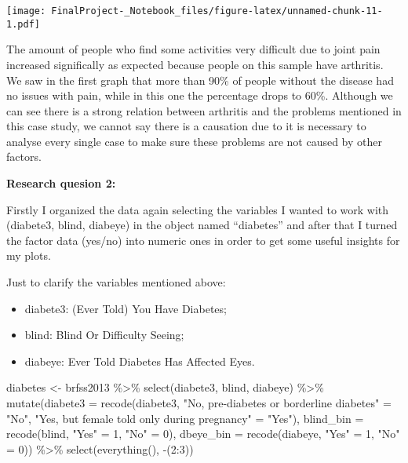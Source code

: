 \documentclass[
]{article}
\newenvironment{Shaded}{\begin{snugshade}}{\end{snugshade}}
\newcommand{\AttributeTok}[1]{\textcolor[rgb]{0.77,0.63,0.00}{#1}}
\newcommand{\DecValTok}[1]{\textcolor[rgb]{0.00,0.00,0.81}{#1}}
\newcommand{\FunctionTok}[1]{\textcolor[rgb]{0.00,0.00,0.00}{#1}}
\newcommand{\NormalTok}[1]{#1}
\newcommand{\OtherTok}[1]{\textcolor[rgb]{0.56,0.35,0.01}{#1}}
\newcommand{\SpecialCharTok}[1]{\textcolor[rgb]{0.00,0.00,0.00}{#1}}
\newcommand{\StringTok}[1]{\textcolor[rgb]{0.31,0.60,0.02}{#1}}
\providecommand{\tightlist}{%
  \setlength{\itemsep}{0pt}\setlength{\parskip}{0pt}}
\begin{document}
\texttt{[image: FinalProject-\_Notebook\_files/figure-latex/unnamed-chunk-11-1.pdf]}

The amount of people who find some activities very difficult due to
joint pain increased significally as expected because people on this
sample have arthritis. We saw in the first graph that more than 90\% of
people without the disease had no issues with pain, while in this one
the percentage drops to 60\%. Although we can see there is a strong
relation between arthritis and the problems mentioned in this case
study, we cannot say there is a causation due to it is necessary to
analyse every single case to make sure these problems are not caused by
other factors.

\textbf{Research quesion 2:}

Firstly I organized the data again selecting the variables I wanted to
work with (diabete3, blind, diabeye) in the object named ``diabetes''
and after that I turned the factor data (yes/no) into numeric ones in
order to get some useful insights for my plots.

Just to clarify the variables mentioned above:

\begin{itemize}
\tightlist
\item
  diabete3: (Ever Told) You Have Diabetes;
\item
  blind: Blind Or Difficulty Seeing;
\item
  diabeye: Ever Told Diabetes Has Affected Eyes.
\end{itemize}

\begin{Shaded}
\begin{Highlighting}[]
\NormalTok{diabetes }\OtherTok{\textless{}{-}}\NormalTok{ brfss2013 }\SpecialCharTok{\%\textgreater{}\%} 
  \FunctionTok{select}\NormalTok{(diabete3, blind, diabeye) }\SpecialCharTok{\%\textgreater{}\%} 
  \FunctionTok{mutate}\NormalTok{(}\AttributeTok{diabete3 =} \FunctionTok{recode}\NormalTok{(diabete3,}
                           \StringTok{"No, pre{-}diabetes or borderline diabetes"} \OtherTok{=} \StringTok{"No"}\NormalTok{,}
                           \StringTok{"Yes, but female told only during pregnancy"} \OtherTok{=} \StringTok{"Yes"}\NormalTok{),}
         \AttributeTok{blind\_bin =} \FunctionTok{recode}\NormalTok{(blind,}
                            \StringTok{"Yes"} \OtherTok{=} \DecValTok{1}\NormalTok{,}
                            \StringTok{"No"} \OtherTok{=} \DecValTok{0}\NormalTok{),}
         \AttributeTok{dbeye\_bin =} \FunctionTok{recode}\NormalTok{(diabeye,}
                            \StringTok{"Yes"} \OtherTok{=} \DecValTok{1}\NormalTok{,}
                            \StringTok{"No"} \OtherTok{=} \DecValTok{0}\NormalTok{)) }\SpecialCharTok{\%\textgreater{}\%} 
  \FunctionTok{select}\NormalTok{(}\FunctionTok{everything}\NormalTok{(), }\SpecialCharTok{{-}}\NormalTok{(}\DecValTok{2}\SpecialCharTok{:}\DecValTok{3}\NormalTok{))}
\end{Highlighting}
\end{Shaded}
\end{document}
